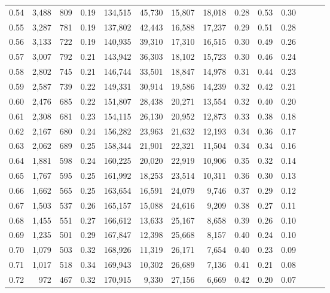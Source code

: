 \begin{tabular}{rrrrrrrrrrrrrr}
0.54 &  3,488 &  809 &  0.19 &  134,515 &   45,730 &  15,807 &  18,018 &  0.28 &  0.53 &      0.30 \\
0.55 &  3,287 &  781 &  0.19 &  137,802 &   42,443 &  16,588 &  17,237 &  0.29 &  0.51 &      0.28 \\
0.56 &  3,133 &  722 &  0.19 &  140,935 &   39,310 &  17,310 &  16,515 &  0.30 &  0.49 &      0.26 \\
0.57 &  3,007 &  792 &  0.21 &  143,942 &   36,303 &  18,102 &  15,723 &  0.30 &  0.46 &      0.24 \\
0.58 &  2,802 &  745 &  0.21 &  146,744 &   33,501 &  18,847 &  14,978 &  0.31 &  0.44 &      0.23 \\
0.59 &  2,587 &  739 &  0.22 &  149,331 &   30,914 &  19,586 &  14,239 &  0.32 &  0.42 &      0.21 \\
0.60 &  2,476 &  685 &  0.22 &  151,807 &   28,438 &  20,271 &  13,554 &  0.32 &  0.40 &      0.20 \\
0.61 &  2,308 &  681 &  0.23 &  154,115 &   26,130 &  20,952 &  12,873 &  0.33 &  0.38 &      0.18 \\
0.62 &  2,167 &  680 &  0.24 &  156,282 &   23,963 &  21,632 &  12,193 &  0.34 &  0.36 &      0.17 \\
0.63 &  2,062 &  689 &  0.25 &  158,344 &   21,901 &  22,321 &  11,504 &  0.34 &  0.34 &      0.16 \\
0.64 &  1,881 &  598 &  0.24 &  160,225 &   20,020 &  22,919 &  10,906 &  0.35 &  0.32 &      0.14 \\
0.65 &  1,767 &  595 &  0.25 &  161,992 &   18,253 &  23,514 &  10,311 &  0.36 &  0.30 &      0.13 \\
0.66 &  1,662 &  565 &  0.25 &  163,654 &   16,591 &  24,079 &   9,746 &  0.37 &  0.29 &      0.12 \\
0.67 &  1,503 &  537 &  0.26 &  165,157 &   15,088 &  24,616 &   9,209 &  0.38 &  0.27 &      0.11 \\
0.68 &  1,455 &  551 &  0.27 &  166,612 &   13,633 &  25,167 &   8,658 &  0.39 &  0.26 &      0.10 \\
0.69 &  1,235 &  501 &  0.29 &  167,847 &   12,398 &  25,668 &   8,157 &  0.40 &  0.24 &      0.10 \\
0.70 &  1,079 &  503 &  0.32 &  168,926 &   11,319 &  26,171 &   7,654 &  0.40 &  0.23 &      0.09 \\
0.71 &  1,017 &  518 &  0.34 &  169,943 &   10,302 &  26,689 &   7,136 &  0.41 &  0.21 &      0.08 \\
0.72 &    972 &  467 &  0.32 &  170,915 &    9,330 &  27,156 &   6,669 &  0.42 &  0.20 &      0.07 \\

\end{tabular}

